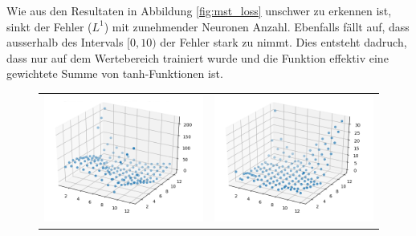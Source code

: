 Wie aus den Resultaten in Abbildung \ref{fig:mst_loss} unschwer zu erkennen ist, sinkt der Fehler ($L^1$) mit zunehmender Neuronen Anzahl. Ebenfalls fällt auf, dass ausserhalb des Intervals $[0, 10)$ der Fehler stark zu nimmt. Dies entsteht dadruch, dass nur auf dem Wertebereich trainiert wurde und die Funktion effektiv eine gewichtete Summe von tanh-Funktionen ist.
\begin{figure}
	\centering
	\begin{tabular}{cc}
		\includegraphics[scale=0.4]{learning/img/abs_plot_2_clean.png} &
		\includegraphics[scale=0.4]{learning/img/abs_plot_6_clean.png} \\

\end{tabular}
\end{figure}
